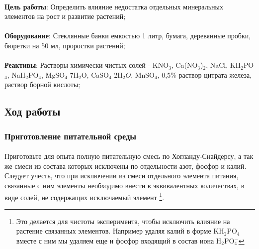 

\begin{footnotesize}

\paragraph*{}\textbf{Цель работы}: Определить \hypertarget{mineral_elements_influence}{влияние недостатка отдельных минеральных элементов} на рост и развитие растений;

\paragraph*{}\textbf{Оборудование}: Стеклянные банки емкостью 1 литр, бумага, деревянные пробки, бюретки на 50 мл, проростки растений;

\paragraph*{}\textbf{Реактивы}: Растворы химически чистых солей - KNO${_3}$, Ca(NO${_3}$)${_2}$, NaCl, KH${_2}$PO${_4}$, NaH${_2}$PO${_4}$, MgSO${_4}$ \textperiodcentered 7H${_2}$O, CaSO${_4}$ \textperiodcentered 2H${_2}O$, MnSO${_4}$, 0,5\% раствор цитрата железа, раствор борной кислоты;

\end{footnotesize}


\subsection*{Ход работы}	
	
\subsubsection*{Приготовление питательной среды}
	
\paragraph*{}Приготовьте для опыта полную питательную смесь по Хогланду-Снайдерсу, а так же смеси из состава которых исключены по отдельности азот, фосфор и калий. Следует учесть, что при исключении из смеси отдельного элемента питания, связанные с ним элементы необходимо внести в эквивалентных количествах, в виде солей, не содержащих исключаемый элемент \footnote{Это делается для чистоты эксперимента, чтобы исключить влияние на растение  связанных элементов. Например удаляя калий в форме   K{H$_2$}PO{$_4$} вместе с ним мы удаляем еще и фосфор входящий в состав иона {H$_2$}PO{$_4^-$}}. 

